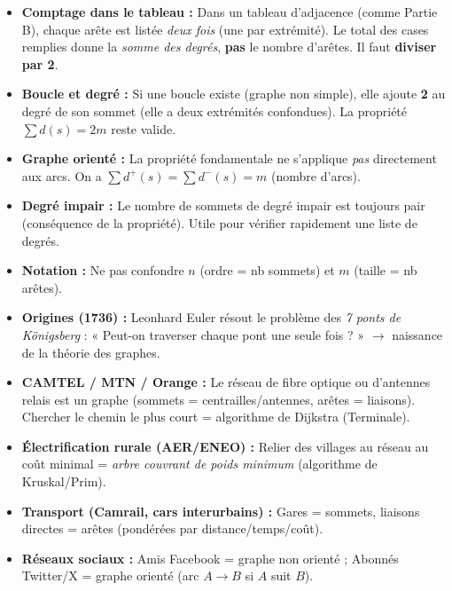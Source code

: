 \documentclass[11pt]{article}
\begin{document}
\begin{attention}
\begin{itemize}
\item \textbf{Comptage dans le tableau :} Dans un tableau d'adjacence (comme Partie B), chaque arête est listée \emph{deux fois} (une par extrémité). Le total des cases remplies donne la \emph{somme des degrés}, \textbf{pas} le nombre d'arêtes. Il faut \textbf{diviser par 2}.
\item \textbf{Boucle et degré :} Si une boucle existe (graphe non simple), elle ajoute \textbf{2} au degré de son sommet (elle a deux extrémités confondues). La propriété $\sum d(s) = 2m$ reste valide.
\item \textbf{Graphe orienté :} La propriété fondamentale ne s'applique \emph{pas} directement aux arcs. On a $\sum d^+(s) = \sum d^-(s) = m$ (nombre d'arcs).
\item \textbf{Degré impair :} Le nombre de sommets de degré impair est toujours pair (conséquence de la propriété). Utile pour vérifier rapidement une liste de degrés.
\item \textbf{Notation :} Ne pas confondre $n$ (ordre = nb sommets) et $m$ (taille = nb arêtes).
\end{itemize}
\end{attention}

\begin{savaistu}
\begin{itemize}
\item \textbf{Origines (1736) :} Leonhard Euler résout le problème des \emph{7 ponts de Königsberg} : « Peut-on traverser chaque pont une seule fois ? » $\rightarrow$ naissance de la théorie des graphes.
\item \textbf{CAMTEL / MTN / Orange :} Le réseau de fibre optique ou d'antennes relais est un graphe (sommets = centrailles/antennes, arêtes = liaisons). Chercher le chemin le plus court = algorithme de Dijkstra (Terminale).
\item \textbf{Électrification rurale (AER/ENEO) :} Relier des villages au réseau au coût minimal = \emph{arbre couvrant de poids minimum} (algorithme de Kruskal/Prim).
\item \textbf{Transport (Camrail, cars interurbains) :} Gares = sommets, liaisons directes = arêtes (pondérées par distance/temps/coût).
\item \textbf{Réseaux sociaux :} Amis Facebook = graphe non orienté ; Abonnés Twitter/X = graphe orienté (arc $A \to B$ si $A$ suit $B$).
\end{itemize}
\end{savaistu}
\end{document}
